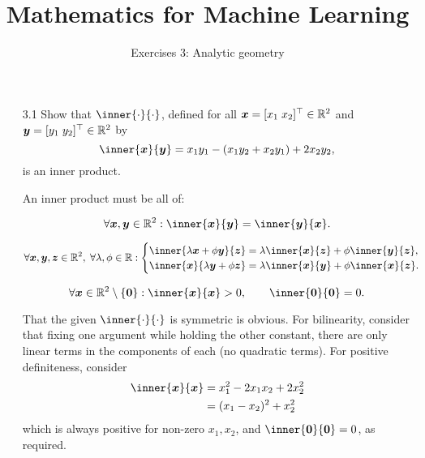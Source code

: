 \documentclass[11pt]{article}
\title{Mathematics for Machine Learning}
\subtitle{Exercises 3: Analytic geometry}
\author{}
\date{}
\begin{document}
\maketitle

\vspace{-4em}
\begin{figure}[h]
    \centering
    
\end{figure}

\begin{enumerate}

    \item[3.1] Show that $\inner{\cdot}{\cdot}$, defined for all $\boldsymbol{x} = [x_1 \; x_2]^\top \in \mathbb{R}^2$ and
          $\boldsymbol{y} = [y_1 \; y_2]^\top \in \mathbb{R}^2$ by
          \[
              \inner{\x}{\y} = x_1 y_1 - (x_1 y_2 + x_2 y_1) + 2 x_2 y_2,
          \]
          is an inner product.

          \vspace{1em}

          An inner product must be all of:

          \[
              \forall \x, \y \in \R^2 : \inner{\x}{\y} = \inner{\y}{\x}.
          \]

          \[
              \forall \x, \y, \z \in \R^2, \;
              \forall \lambda, \phi \in \R :
              \begin{cases}
                  \inner{ \lambda \x + \phi \y }{ \z } = \lambda \inner{\x}{\z} + \phi \inner{\y}{\z}, \\
                  \inner{ \x }{ \lambda \y + \phi \z } = \lambda \inner{\x}{\y} + \phi \inner{\x}{\z}. \\
              \end{cases}
          \]

          \[
              \forall \x \in \R^2 \setminus \set{\vect{0}} :
              \inner{\x}{\x} > 0,
              \qquad
              \inner{\vect{0}}{\vect{0}} = 0.
          \]

          That the given $\inner{\cdot}{\cdot}$ is symmetric is obvious.  For bilinearity, consider that fixing
          one argument while holding the other constant, there are only linear terms in the components of each (no
          quadratic terms).  For positive definiteness, consider
          \[
              \begin{aligned}
                  \inner{\x}{\x} & = x_1^2 - 2 x_1 x_2 + 2 x_2^2 \\
                                 & = (x_1 - x_2)^2 + x_2^2
              \end{aligned}
          \]
          which is always positive for non-zero $x_1, x_2$, and $\inner{\vect{0}}{\vect{0}} = 0$, as required.


\end{enumerate}
\end{document}
